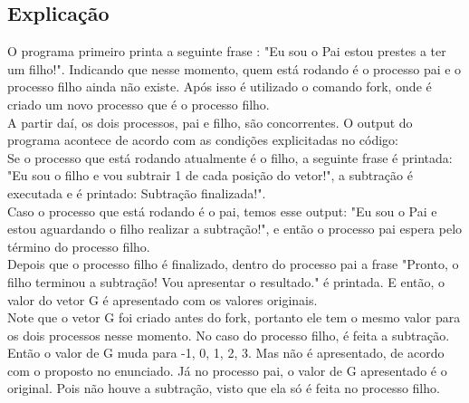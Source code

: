\subsection*{Explicação}
O programa primeiro printa a seguinte frase : "Eu sou o Pai estou prestes a ter um filho!". Indicando que nesse momento, quem está rodando é o processo pai e o processo filho ainda não existe. Após isso é utilizado o comando fork, onde é criado um novo processo que é o processo filho.\\
    A partir daí, os dois processos, pai e filho, são concorrentes. O output do programa acontece de acordo com as condições explicitadas no código:\\
    Se o processo que está rodando atualmente é o filho, a seguinte frase é printada: "Eu sou o filho e vou subtrair 1 de cada posição do vetor!", a subtração é executada e é printado: Subtração finalizada!".\\
    Caso o processo que está rodando é o pai, temos esse output: "Eu sou o Pai e estou aguardando o filho realizar a subtração!", e então o processo pai espera pelo término do processo filho.\\
    Depois que o processo filho é finalizado, dentro do processo pai a frase "Pronto, o filho terminou a subtração! Vou apresentar o resultado." é printada. E então, o valor do vetor G é apresentado com os valores originais.\\
Note que o vetor G foi criado antes do fork, portanto ele tem o mesmo valor para os dois processos nesse momento.
No caso do processo filho, é feita a subtração. Então o valor de G muda para {-1, 0, 1, 2, 3}. Mas não é apresentado, de acordo com o proposto no enunciado.
Já no processo pai, o valor de G apresentado é o original. Pois não houve a subtração, visto que ela só é feita no processo filho.
